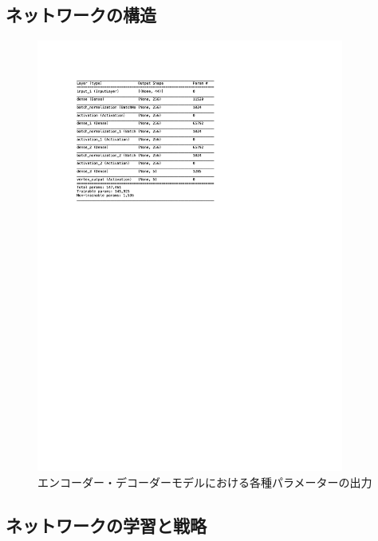 \subsection{ネットワークの構造} \label{Net:PM:StructureofPM}


\begin{figure}[h]
 \centering
 \includegraphics[trim = 0 0 200 200, width=0.9\textwidth]{Figure/3Networks/3-3-1-1PairModelSummary.png}
 \caption{エンコーダー・デコーダーモデルにおける各種パラメーターの出力}
 \label{3-3-1-1PairModelSummary}
\end{figure}


\subsection{ネットワークの学習と戦略} \label{Net:PM:TrainingandStrategyofPM}



